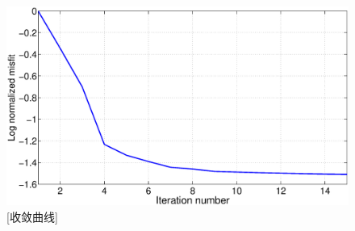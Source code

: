 \begin{figure}[!htbp]
    \centering
    {\includegraphics[width=1.0\linewidth]{figure/fmisfit}}
    [收敛曲线]
    \label{fig:misfit_fmodel}
\end{figure}

